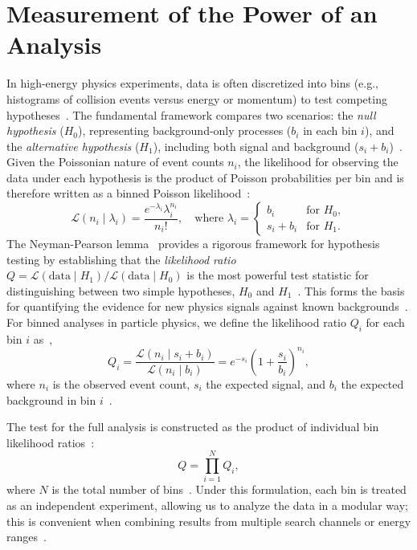 \section{Measurement of the Power of an Analysis}
\label{sec:power_analysis}

In high-energy physics experiments, data is often discretized into bins (e.g., histograms of collision events versus energy or momentum) to test competing hypotheses~\cite{BakerCousins:1984}. The fundamental framework compares two scenarios: the \textit{null hypothesis} ($H_0$), representing background-only processes ($b_i$ in each bin $i$), and the \textit{alternative hypothesis} ($H_1$), including both signal and background ($s_i + b_i$)~\cite{NeymanPearson:1933}. Given the Poissonian nature of event counts $n_i$, the likelihood for observing the data under each hypothesis is the product of Poisson probabilities per bin and is therefore written as a binned Poisson likelihood~\cite{BakerCousins:1984,Cowan:2011}:
\begin{equation}
    \mathcal{L}(n_i \mid \lambda_i) = \frac{e^{-\lambda_i} \lambda_i^{n_i}}{n_i!}, \quad \text{where } \lambda_i = 
    \begin{cases}
        b_i & \text{for } H_0, \\
        s_i + b_i & \text{for } H_1.
    \end{cases}
\end{equation}
The Neyman-Pearson lemma~\parencite{NeymanPearson:1933,Segura:2024srj} provides a rigorous framework for hypothesis testing by establishing that the \textit{likelihood ratio} $Q = \mathcal{L}(\text{data} \mid H_1)/\mathcal{L}(\text{data} \mid H_0)$ is the most powerful test statistic for distinguishing between two simple hypotheses, $H_0$ and $H_1$~\cite{NeymanPearson:1933,Cowan:2011}. This forms the basis for quantifying the evidence for new physics signals against known backgrounds~\cite{Cowan:2011,Read:2002}. For binned analyses in particle physics, we define the likelihood ratio $Q_i$ for each bin $i$ as~\cite{BakerCousins:1984,Cowan:2011},
\begin{equation}
Q_i = \frac{\mathcal{L}(n_i \mid s_i + b_i)}{\mathcal{L}(n_i \mid b_i)} = e^{-s_i} \left( 1+\frac{s_i}{b_i} \right)^{n_i},
\end{equation}
where $n_i$ is the observed event count, $s_i$ the expected signal, and $b_i$ the expected background in bin $i$~\cite{BakerCousins:1984,Cowan:2011}. 

The test for the full analysis is constructed as the product of individual bin likelihood ratios~\cite{BakerCousins:1984,Cowan:2011}:
\begin{equation}
Q = \prod_{i=1}^{N} Q_i,
\end{equation}
where $N$ is the total number of bins~\cite{BakerCousins:1984}. Under this formulation, each bin is treated as an independent experiment, allowing us to analyze the data in a modular way; this is convenient when combining results from multiple search channels or energy ranges~\cite{Read:2002,Cowan:2011}. 


